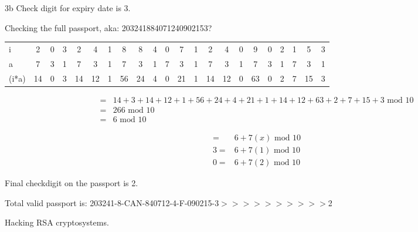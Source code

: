 \begin{question}{3b}
Check digit for expiry date is 3.



Checking the full passport, aka: 203241884071240902153?

\begin{tabular}{l|ccccccccccccccccccccc}
\hline
i     &  2  & 0  & 3  & 2  & 4  & 1  & 8  & 8  & 4  & 0  & 7  & 1  & 2  & 4  & 0  & 9  & 0  & 2  & 1  & 5  & 3 \\
a     & 7   & 3  & 1  & 7  & 3  & 1  & 7  & 3  & 1  & 7  & 3  & 1  & 7  & 3  & 1  & 7  & 3  & 1  & 7  & 3  & 1 \\
\hline
(i*a) & 14 & 0 & 3  & 14  & 12 & 1  & 56 & 24 & 4  & 0  & 21 & 1  & 14 & 12 & 0  & 63 & 0  & 2  & 7  & 15 & 3
\end{tabular}

\begin{align*}
=& 14  + 3   + 14   + 12  + 1   + 56  + 24  + 4   + 21  + 1   + 14  + 12  + 63  + 2   + 7   + 15  + 3 \textrm{ mod } 10\\
=& 266 \textrm{ mod } 10\\
=& 6 \textrm{ mod } 10
\end{align*}

\begin{align*}
=& 6 + 7(x)\textrm{ mod } 10\\
3=& 6 + 7(1)\textrm{ mod } 10\\
0=& 6 + 7(2)\textrm{ mod } 10
\end{align*}

Final checkdigit on the passport is 2.

Total valid passport is: 203241-8-CAN-840712-4-F-090215-3$>>>>>>>>>>$2


\end{question}


\begin{question}{4}
Hacking RSA cryptosystems.
\end{question}


